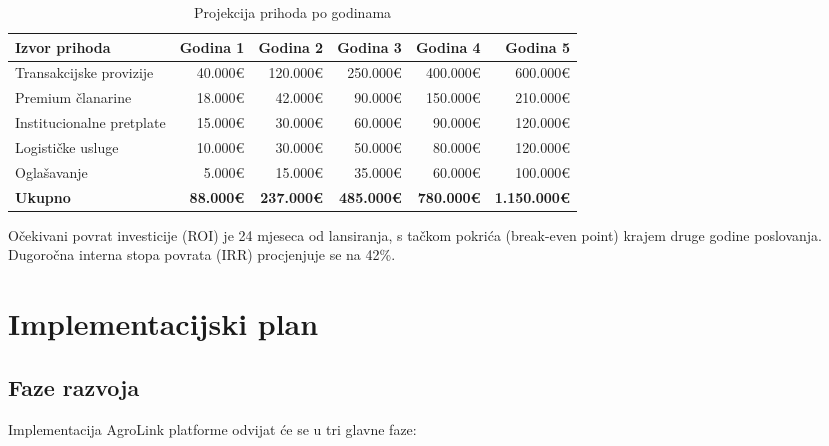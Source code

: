 \documentclass[a4paper,12pt]{article}
\begin{document}
\begin{table}[H]
\centering
\caption{Projekcija prihoda po godinama}
\begin{tabularx}{\textwidth}{|l|r|r|r|r|r|}
\hline
\textbf{Izvor prihoda} & \textbf{Godina 1} & \textbf{Godina 2} & \textbf{Godina 3} & \textbf{Godina 4} & \textbf{Godina 5} \\
\hline
Transakcijske provizije & 40.000€ & 120.000€ & 250.000€ & 400.000€ & 600.000€ \\
\hline
Premium članarine & 18.000€ & 42.000€ & 90.000€ & 150.000€ & 210.000€ \\
\hline
Institucionalne pretplate & 15.000€ & 30.000€ & 60.000€ & 90.000€ & 120.000€ \\
\hline
Logističke usluge & 10.000€ & 30.000€ & 50.000€ & 80.000€ & 120.000€ \\
\hline
Oglašavanje & 5.000€ & 15.000€ & 35.000€ & 60.000€ & 100.000€ \\
\hline
\textbf{Ukupno} & \textbf{88.000€} & \textbf{237.000€} & \textbf{485.000€} & \textbf{780.000€} & \textbf{1.150.000€} \\
\hline
\end{tabularx}
\end{table}

Očekivani povrat investicije (ROI) je 24 mjeseca od lansiranja, s tačkom pokrića (break-even point) krajem druge godine poslovanja. Dugoročna interna stopa povrata (IRR) procjenjuje se na 42\%.

\section{Implementacijski plan}
\label{sec:implementacijski-plan}

\subsection{Faze razvoja}

Implementacija AgroLink platforme odvijat će se u tri glavne faze:
\end{document}
